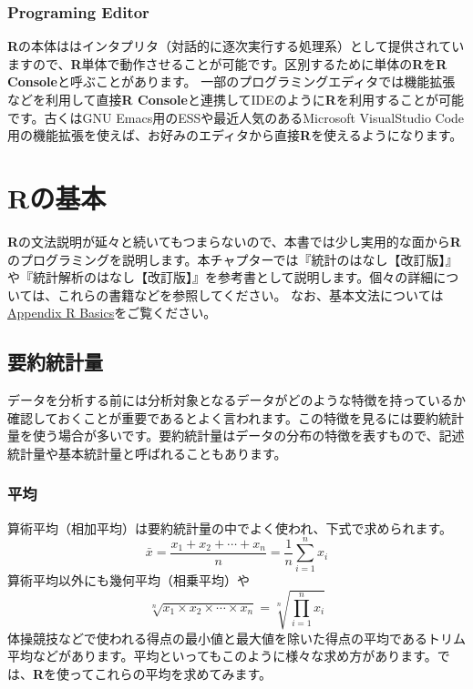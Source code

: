 \documentclass[
  12pt,
]{book}
\begin{document}
\hypertarget{programing-editor}{%
\subsection{Programing Editor}\label{programing-editor}}

\textbf{R}の本体ははインタプリタ（対話的に逐次実行する処理系）として提供されていますので、\textbf{R}単体で動作させることが可能です。区別するために単体の\textbf{R}を\textbf{R Console}と呼ぶことがあります。 一部のプログラミングエディタでは機能拡張などを利用して直接\textbf{R Console}と連携してIDEのように\textbf{R}を利用することが可能です。古くはGNU Emacs用のESSや最近人気のあるMicrosoft VisualStudio Code用の機能拡張を使えば、お好みのエディタから直接\textbf{R}を使えるようになります。

\hypertarget{rux306eux57faux672c}{%
\chapter{Rの基本}\label{rux306eux57faux672c}}

\textbf{R}の文法説明が延々と続いてもつまらないので、本書では少し実用的な面から\textbf{R}のプログラミングを説明します。本チャプターでは『統計のはなし【改訂版】』\citep{ToukeinoHanashi}や『統計解析のはなし【改訂版】』\citep{ToukeiKaisekinoHanashi}を参考書として説明します。個々の詳細については、これらの書籍などを参照してください。 なお、基本文法については\protect\hyperlink{Appendix-RBasics}{Appendix R Basics}をご覧ください。

\hypertarget{ux8981ux7d04ux7d71ux8a08ux91cf}{%
\section{要約統計量}\label{ux8981ux7d04ux7d71ux8a08ux91cf}}

データを分析する前には分析対象となるデータがどのような特徴を持っているか確認しておくことが重要であるとよく言われます。この特徴を見るには要約統計量を使う場合が多いです。要約統計量はデータの分布の特徴を表すもので、記述統計量や基本統計量と呼ばれることもあります。

\hypertarget{ux5e73ux5747}{%
\subsection{平均}\label{ux5e73ux5747}}

算術平均（相加平均）は要約統計量の中でよく使われ、下式で求められます。 \[\bar{x} = \frac{x_1 + x_2 + \cdots + x_n}{n} = \frac{1}{n} \sum_{i = 1}^n x_i\] 算術平均以外にも幾何平均（相乗平均）や \[\sqrt[n]{x_1 \times x_2 \times \cdots \times x_n} = \sqrt[n]{\prod_{i = 1}^n x_i}\] 体操競技などで使われる得点の最小値と最大値を除いた得点の平均であるトリム平均などがあります。平均といってもこのように様々な求め方があります。では、\textbf{R}を使ってこれらの平均を求めてみます。
\end{document}
